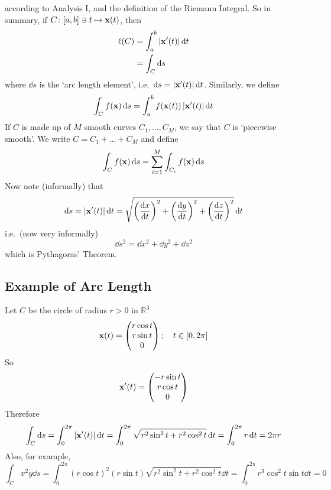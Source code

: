according to Analysis I, and the definition of the Riemann Integral.
So in summary, if \(C \colon [a, b] \ni t \mapsto \vb x(t)\), then
\begin{align*}
	\ell(C) & = \int_a^b \abs{\vb x'(t)} \dd{t} \\
	        & = \int_C \dd{s}
\end{align*}
where \(\dd{s}\) is the `arc length element', i.e.\ \(\dd{s} = \abs{\vb x'(t)} \dd{t}\).
Similarly, we define
\[
	\int_C f(\vb x) \dd{s} = \int_a^b f(\vb x(t)) \,\abs{\vb x'(t)} \dd{t}
\]
If \(C\) is made up of \(M\) smooth curves \(C_1, \dots, C_M\), we say that \(C\) is `piecewise smooth'.
We write \(C = C_1 + \dots + C_M\) and define
\[
	\int_C f(\vb x) \dd{s} = \sum_{i=1}^M \int_{C_i}f(\vb x) \dd{s}
\]
Now note (informally) that
\[
	\dd{s} = \abs{\vb x'(t)}\dd{t} = \sqrt{\left( \frac{\dd{x}}{\dd{t}} \right)^2 + \left( \frac{\dd{y}}{\dd{t}} \right)^2 + \left( \frac{\dd{z}}{\dd{t}} \right)^2} \dd{t}
\]
i.e.\ (now very informally)
\[
	\dd{s}^2 = \dd{x}^2 + \dd{y}^2 + \dd{z}^2
\]
which is Pythagoras' Theorem.

\subsection{Example of Arc Length}
Let \(C\) be the circle of radius \(r>0\) in \(\mathbb R^3\)
\[
	\vb x(t) = \begin{pmatrix}
		r\cos t \\ r\sin t \\ 0
	\end{pmatrix};\quad t \in [0, 2\pi]
\]
So
\[
	\vb x'(t) = \begin{pmatrix}
		-r\sin t \\ r\cos t \\ 0
	\end{pmatrix}
\]
Therefore
\[
	\int_C \dd{s} = \int_0^{2\pi} \abs{\vb x'(t)} \dd{t} = \int_0^{2\pi} \sqrt{r^2 \sin^2 t + r^2 \cos^2 t} \dd{t} = \int_0^{2\pi} r \dd{t} = 2\pi r
\]
Also, for example,
\[
	\int_C x^2 y \dd{s} = \int_0^{2\pi} (r \cos t)^2 (r \sin t) \sqrt{r^2 \sin^2 t + r^2 \cos^2 t} \dd{t} = \int_0^{2\pi} r^3 \cos^2 t \sin t \dd{t} = 0
\]

